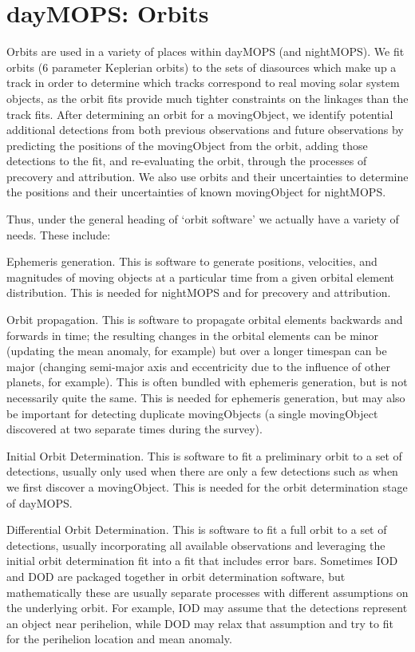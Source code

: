 \section{dayMOPS: Orbits}
\label{orbits}

Orbits are used in a variety of places within dayMOPS (and nightMOPS). We fit orbits (6 parameter Keplerian orbits) to the sets of diasources which make up a track in order to determine which tracks correspond to real moving solar system objects, as the orbit fits provide much tighter constraints on the linkages than the track fits.  After determining an orbit for a movingObject, we identify potential additional detections from both previous observations and future observations by predicting the positions of the movingObject from the orbit, adding those detections to the fit, and re-evaluating the orbit, through the processes of precovery and attribution. We also use orbits and their uncertainties to determine the positions and their uncertainties of known movingObject for nightMOPS. 

Thus, under the general heading of `orbit software' we actually have a variety of needs. These include:
\begin{itemize}
{\item Ephemeris generation. This is software to generate positions, velocities, and magnitudes of moving objects at a particular time from a given orbital element distribution.  This is needed for nightMOPS and for precovery and attribution. }
{\item Orbit propagation. This is software to propagate orbital elements backwards and forwards in time; the resulting changes in the orbital elements can be minor (updating the mean anomaly, for example) but over a longer timespan can be major (changing semi-major axis and eccentricity due to the influence of other planets, for example). This is often bundled with ephemeris generation, but is not necessarily quite the same. This is needed for ephemeris generation, but may also be important for detecting duplicate movingObjects (a single movingObject discovered at two separate times during the survey). }
{\item Initial Orbit Determination. This is software to fit a preliminary orbit to a set of detections, usually only used when there are only a few detections such as when we first discover a movingObject. This is needed for the orbit determination stage of dayMOPS. }
{\item Differential Orbit Determination.  This is software to fit a full orbit to a set of detections, usually incorporating all available observations and leveraging the initial orbit determination fit into a fit that includes error bars. Sometimes IOD and DOD are packaged together in orbit determination software, but mathematically these are usually separate processes with different assumptions on the underlying orbit. For example, IOD may assume that the detections represent an object near perihelion, while DOD may relax that assumption and try to fit for the perihelion location and mean anomaly. }
\end{itemize}

